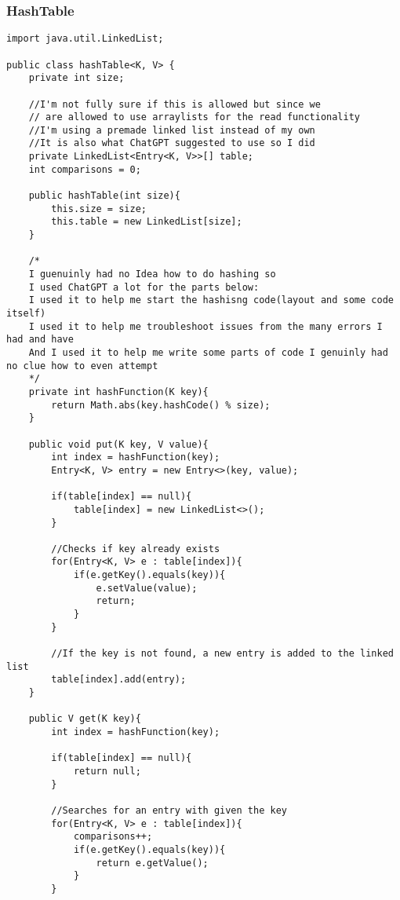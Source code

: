 \documentclass[10pt]{article}
\begin{document}
\subsubsection{HashTable}
\lstset{numbers=left, numberstyle=\tiny, stepnumber=1, numbersep=5pt, basicstyle=\footnotesize\ttfamily}
\begin{lstlisting}[frame=single, ]  
import java.util.LinkedList;

public class hashTable<K, V> {
    private int size;

    //I'm not fully sure if this is allowed but since we
    // are allowed to use arraylists for the read functionality
    //I'm using a premade linked list instead of my own
    //It is also what ChatGPT suggested to use so I did
    private LinkedList<Entry<K, V>>[] table;
    int comparisons = 0;
    
    public hashTable(int size){
        this.size = size;
        this.table = new LinkedList[size];
    }
    
    /*
    I guenuinly had no Idea how to do hashing so 
    I used ChatGPT a lot for the parts below:
    I used it to help me start the hashisng code(layout and some code itself)
    I used it to help me troubleshoot issues from the many errors I had and have
    And I used it to help me write some parts of code I genuinly had no clue how to even attempt
    */
    private int hashFunction(K key){
        return Math.abs(key.hashCode() % size);
    }
    
    public void put(K key, V value){
        int index = hashFunction(key);
        Entry<K, V> entry = new Entry<>(key, value);
        
        if(table[index] == null){
            table[index] = new LinkedList<>();
        }
        
        //Checks if key already exists
        for(Entry<K, V> e : table[index]){
            if(e.getKey().equals(key)){
                e.setValue(value);
                return;
            }
        }
        
        //If the key is not found, a new entry is added to the linked list
        table[index].add(entry);
    }
    
    public V get(K key){
        int index = hashFunction(key);
        
        if(table[index] == null){
            return null;
        }
        
        //Searches for an entry with given the key
        for(Entry<K, V> e : table[index]){
            comparisons++;
            if(e.getKey().equals(key)){
                return e.getValue();
            }
        }
        

\end{lstlisting}
\end{document}
